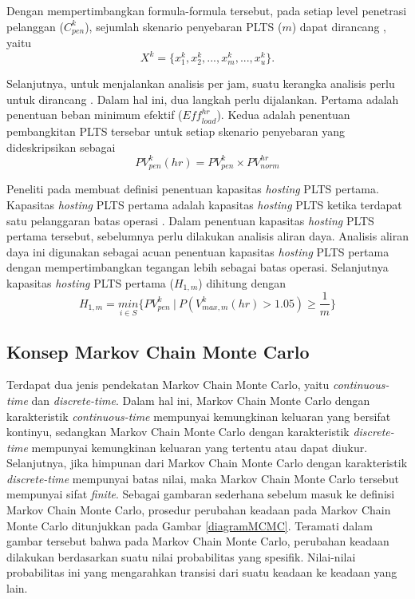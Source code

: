 {{{{{{Dengan mempertimbangkan formula-formula tersebut, pada setiap level penetrasi pelanggan  ($C_{pen}^k$), sejumlah skenario penyebaran PLTS ($m$) dapat dirancang \cite{Dubey2017}, yaitu
\begin{equation}
X^k=\{x^k_{1},x^k_{2},...,x^{k}_{m},...,x^{k}_{u}\}\label{rpds]}.
\end{equation}

Selanjutnya, untuk menjalankan analisis per jam, suatu kerangka analisis perlu untuk dirancang \cite{Dubey2017}. Dalam hal ini, dua langkah perlu dijalankan. Pertama adalah penentuan beban minimum efektif ($\mathit{Eff^{hr}_{load}}$). Kedua adalah penentuan pembangkitan PLTS tersebar untuk setiap skenario penyebaran yang dideskripsikan sebagai
\begin{equation}
PV^k_{pen}(hr)=PV^k_{pen}\times PV^{hr}_{norm}\label{hrpia}
\end{equation}

Peneliti pada \cite{Dubey2017} membuat definisi penentuan kapasitas \textit{hosting} PLTS pertama. Kapasitas \textit{hosting} PLTS pertama adalah kapasitas \textit{hosting} PLTS ketika terdapat satu pelanggaran batas operasi \cite{Dubey2017}. Dalam penentuan kapasitas \textit{hosting} PLTS pertama tersebut, sebelumnya perlu dilakukan analisis aliran daya. Analisis aliran daya ini digunakan sebagai acuan penentuan kapasitas \textit{hosting} PLTS pertama dengan mempertimbangkan tegangan lebih sebagai batas operasi. Selanjutnya kapasitas \textit{hosting} PLTS pertama ($\mathit{H_{1,m}}$) dihitung dengan \cite{Dubey2017}
\begin{equation}
\mathit{H_{1,m}}=\underset{i\in S}{min}\Big\{PV^k_{pen}\ |\ P(V^k_{max,m}(hr)>1.05)\geq \dfrac{1}{m}\Big\}\label{fphc}
\end{equation}


\subsection{Konsep Markov Chain Monte Carlo}
Terdapat dua jenis pendekatan Markov Chain Monte Carlo, yaitu \textit{continuous-time} dan \textit{discrete-time}. Dalam hal ini, Markov Chain Monte Carlo dengan karakteristik \textit{continuous-time} mempunyai kemungkinan keluaran yang bersifat kontinyu, sedangkan Markov Chain Monte Carlo dengan karakteristik \textit{discrete-time} mempunyai kemungkinan keluaran yang tertentu atau dapat diukur. Selanjutnya, jika himpunan dari Markov Chain Monte Carlo dengan karakteristik \textit{discrete-time} mempunyai batas nilai, maka Markov Chain Monte Carlo tersebut mempunyai sifat \textit{finite}. Sebagai gambaran sederhana sebelum masuk ke definisi Markov Chain Monte Carlo, prosedur perubahan keadaan pada Markov Chain Monte Carlo ditunjukkan pada Gambar \ref{diagramMCMC}. Teramati dalam gambar tersebut bahwa pada Markov Chain Monte Carlo, perubahan keadaan dilakukan berdasarkan suatu nilai probabilitas yang spesifik. Nilai-nilai probabilitas ini yang mengarahkan transisi dari suatu keadaan ke keadaan yang lain.

}}}}}}
